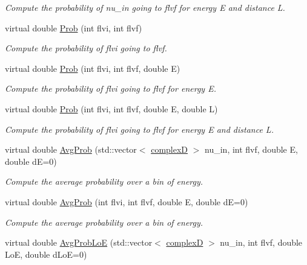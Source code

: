 \begin{DoxyCompactItemize}
\begin{DoxyCompactList}\small\item\em Compute the probability of nu\+\_\+in going to flvf for energy E and distance L. \end{DoxyCompactList}\item 
virtual double \hyperlink{classOscProb_1_1PMNS__Base_aec5c399b93261f1962a4b7dbbb44b973}{Prob} (int flvi, int flvf)
\begin{DoxyCompactList}\small\item\em Compute the probability of flvi going to flvf. \end{DoxyCompactList}\item 
virtual double \hyperlink{classOscProb_1_1PMNS__Base_aa3cee10639d5c0879ccb9e78d62128d3}{Prob} (int flvi, int flvf, double E)
\begin{DoxyCompactList}\small\item\em Compute the probability of flvi going to flvf for energy E. \end{DoxyCompactList}\item 
virtual double \hyperlink{classOscProb_1_1PMNS__Base_a6e0a74508d9d6db7be02e242b8467563}{Prob} (int flvi, int flvf, double E, double L)
\begin{DoxyCompactList}\small\item\em Compute the probability of flvi going to flvf for energy E and distance L. \end{DoxyCompactList}\item 
virtual double \hyperlink{classOscProb_1_1PMNS__Base_a89e54c80ae8a31effbab7b2b970606bb}{Avg\+Prob} (std\+::vector$<$ \hyperlink{EigenPoint_8h_a67ca8e107e20610c3fff78d5e726ece0}{complexD} $>$ nu\+\_\+in, int flvf, double E, double dE=0)
\begin{DoxyCompactList}\small\item\em Compute the average probability over a bin of energy. \end{DoxyCompactList}\item 
virtual double \hyperlink{classOscProb_1_1PMNS__Base_ac03f754160422e6600da8dbae0f803ed}{Avg\+Prob} (int flvi, int flvf, double E, double dE=0)
\begin{DoxyCompactList}\small\item\em Compute the average probability over a bin of energy. \end{DoxyCompactList}\item 
virtual double \hyperlink{classOscProb_1_1PMNS__Base_a19f160c045a01e5083506e925fb37d44}{Avg\+Prob\+LoE} (std\+::vector$<$ \hyperlink{EigenPoint_8h_a67ca8e107e20610c3fff78d5e726ece0}{complexD} $>$ nu\+\_\+in, int flvf, double LoE, double d\+LoE=0)

\end{DoxyCompactItemize}
